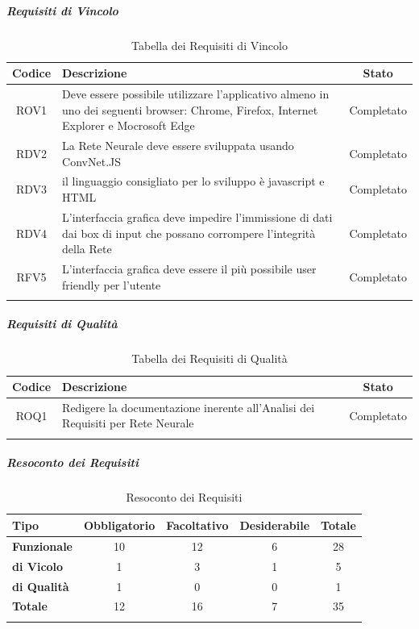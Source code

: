 \subparagraph{Requisiti di Vincolo}\mbox{}
\label{Requisiti di Vincolo}

\begin{longtable}{|c|p{7cm}|c|}
	\hline
	\textbf{Codice} & \textbf{Descrizione} & \textbf{Stato} \\\hline\hline
	   
	   ROV1 & Deve essere possibile utilizzare l'applicativo almeno in uno dei seguenti browser: Chrome, Firefox, Internet Explorer e Mocrosoft Edge & Completato  \\
	   \hline
	   RDV2 & La Rete Neurale deve essere sviluppata usando ConvNet.JS & Completato  \\
	   \hline
	   RDV3 & il linguaggio consigliato per lo sviluppo \`e javascript e HTML  & Completato \\
	   \hline
	   RDV4 & L'interfaccia grafica deve impedire l'immissione di dati dai box di input che possano corrompere  l'integrit\`a della Rete & Completato \\
	   \hline
	   RFV5 & L'interfaccia grafica deve essere il pi\`u possibile user friendly per l'utente & Completato \\
	   \hline

\caption{Tabella dei Requisiti di Vincolo}\label{tab:requisiti di vincolo}
\end{longtable}

\subparagraph{Requisiti di Qualit\`a}\mbox{}
\label{Requisiti di Qualita}

\begin{longtable}{|c|p{7cm}|c|}
	\hline
	\textbf{Codice} & \textbf{Descrizione} & \textbf{Stato} \\\hline\hline
	
	   ROQ1 & Redigere la documentazione inerente all'Analisi dei Requisiti per Rete Neurale & Completato  \\
	   \hline
	
\caption{Tabella dei Requisiti di Qualit\`a}\label{tab:requisiti di qualita}
\end{longtable}


\subparagraph{Resoconto dei Requisiti}\mbox{}
\label{Resoconto dei Requisiti}


\begin{longtable}{|l|c|c|c|c|}
	\hline
	\textbf{Tipo} & \textbf{Obbligatorio} & \textbf{Facoltativo} & \textbf{Desiderabile} & \textbf{Totale} \\\hline\hline
	   
\textbf{Funzionale} & 10 & 12 & 6 & 28 \\
	   \hline
\textbf{di Vicolo} & 1 & 3 & 1 & 5 \\
	   \hline
\textbf{di Qualit\`a} & 1 & 0 & 0 & 1 \\
	   \hline
\textbf{Totale} & 12 & 16 & 7 & 35 \\
\hline

\caption{Resoconto dei Requisiti}\label{tab:resoconto dei requisiti}
\end{longtable}



